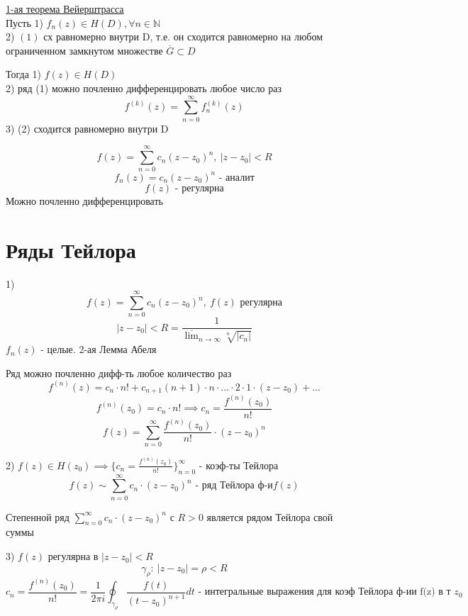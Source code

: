 \documentclass[a4paper]{article}
\begin{document}
\begin{tcolorbox}
    \underline{1-ая теорема Вейерштрасса}\\
    Пусть 1) $ f_n(z) \in H(D), \forall n \in \mathbb{N} $\\
    2) $ (1) $ сх равномерно внутри D, т.е. он сходится равномерно на любом
    ограниченном замкнутом множестве $ \overline{G} \subset D $ 

    Тогда 1) $ f(z) \in H(D) $ \\
    2) ряд (1) можно почленно дифференцировать любое число раз
    \begin{equation}
        f^{(k)}(z) = \sum_{n=0}^{\infty} f_n^{(k)}(z)
    \end{equation}
    3) (2) сходится равномерно внутри D
\end{tcolorbox}

\[
    f(z) = \sum_{n=0}^{\infty} c_n (z - z_0)^{n}, \ |z - z_0| < R
\]
\[
    f_n(z) = c_n (z - z_0)^{n} \text{ - аналит}
\]
\[
    f(z) \text{ - регулярна}
\]
Можно почленно дифференцировать

\section*{\centering Ряды Тейлора}

1)
\[
    f(z) = \sum_{n=0}^{\infty} c_n (z - z_0)^{n}, \ f(z) \text{ регулярна}
\]
\[
    |z - z_0| < R = \frac{1}{\overline{\lim}_{n \to \infty} \sqrt[n]{|c_n|} } 
\]
$ f_n(z) $ - целые. 2-ая Лемма Абеля

Ряд можно почленно дифф-ть любое количество раз
\[
    f^{(n)}(z) = c_n \cdot n! + c_{n+1}(n + 1) \cdot n \cdot \dots \cdot 2 \cdot 1
    \cdot (z - z_0) + \dots
\]
\[
    f^{(n)}(z_0) = c_n \cdot n! \implies c_n = \frac{f^{(n)}(z_0)}{n!} 
\]
\[
    f(z) = \sum_{n=0}^{\infty} \frac{f^{(n)}(z_0)}{n!} \cdot ( z- z_0)^{n}
\]

2) $ f(z) \in H(z_0) \implies \{ c_n = \frac{f^{(n)}(z_0)}{n!}  \}_{n=0}^{\infty} $ 
- коэф-ты Тейлора
\[
    f(z) \sim \sum_{n=0}^{\infty} c_n \cdot (z - z_0)^{n} \text{ - ряд Тейлора ф-и} f(z)
\]

Степенной ряд $ \sum_{n=0}^{\infty} c_n \cdot (z - z_0)^{n} $ с $ R > 0 $ является
рядом Тейлора свой суммы

3) $ f(z) $ регулярна в $ |z - z_0| < R $ 
\[
    \gamma_{\rho}: \ |z-z_0| = \rho < R
\]
\[
    c_n = \frac{f^{(n)}(z_0)}{n!} = \frac{1}{2 \pi i} \oint_{\gamma_{\rho}}
    \frac{f(t)}{(t - z_0)^{n + 1}} dt \text{ - интегральные выражения для 
    коэф Тейлора ф-ии f(z) в т }z_0
\]
\end{document}
